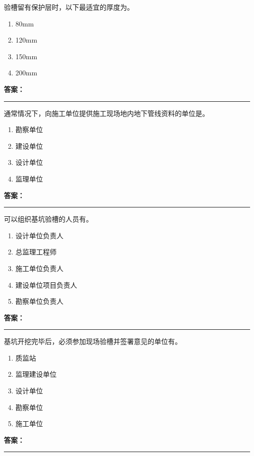 \documentclass[UTF8,fontset=fandol,11pt]{ctexart}
\newcommand{\answerline}{\textcolor{answerred}{\rule{2.4cm}{0.7pt}}}
\begin{document}
\vspace{0.2em}

\begin{quizbox}[title={第 22 题}]
验槽留有保护层时，以下最适宜的厚度为。\\
\begin{enumerate}[label=\Alph*.]
\item 80mm
\item 120mm
\item 150mm
\item 200mm
\end{enumerate}
\textbf{\textcolor{answerred}{答案：}} \answerline
\end{quizbox}

\vspace{0.2em}

\begin{quizbox}[title={第 23 题}]
通常情况下，向施工单位提供施工现场地内地下管线资料的单位是。\\
\begin{enumerate}[label=\Alph*.]
\item 勘察单位
\item 建设单位
\item 设计单位
\item 监理单位
\end{enumerate}
\textbf{\textcolor{answerred}{答案：}} \answerline
\end{quizbox}

\vspace{0.2em}

\begin{quizbox}[title={第 24 题}]
可以组织基坑验槽的人员有。\\
\begin{enumerate}[label=\Alph*.]
\item 设计单位负责人
\item 总监理工程师
\item 施工单位负责人
\item 建设单位项目负责人
\item 勘察单位负责人
\end{enumerate}
\textbf{\textcolor{answerred}{答案：}} \answerline
\end{quizbox}

\vspace{0.2em}

\begin{quizbox}[title={第 25 题}]
基坑开挖完毕后，必须参加现场验槽并签署意见的单位有。\\
\begin{enumerate}[label=\Alph*.]
\item 质监站
\item 监理建设单位
\item 设计单位
\item 勘察单位
\item 施工单位
\end{enumerate}
\textbf{\textcolor{answerred}{答案：}} \answerline
\end{quizbox}
\end{document}
